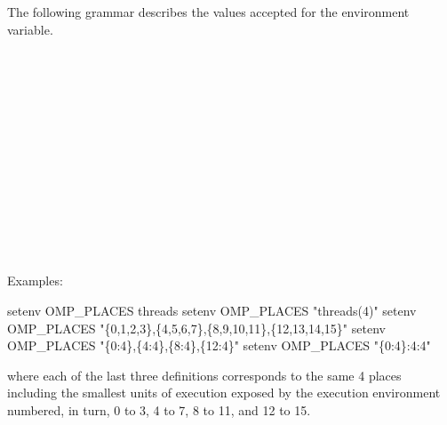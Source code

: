 The following grammar describes the values accepted for the  environment
variable.

\begin{bnf*}
    \\
    \\
    \\
    \\
    \\
    \\
    \\
    \\
    \\
    \\
    \\
    \\
\end{bnf*}

\begin{samepage}
Examples:
\begin{boxedcode}
setenv OMP\_PLACES threads
setenv OMP\_PLACES "threads(4)"
setenv OMP\_PLACES "\{0,1,2,3\},\{4,5,6,7\},\{8,9,10,11\},\{12,13,14,15\}"
setenv OMP\_PLACES "\{0:4\},\{4:4\},\{8:4\},\{12:4\}"
setenv OMP\_PLACES "\{0:4\}:4:4"
\end{boxedcode}
\end{samepage}

where each of the last three definitions corresponds to the same 4 places including the 
smallest units of execution exposed by the execution environment numbered, in turn, 0 
to 3, 4 to 7, 8 to 11, and 12 to 15. 

